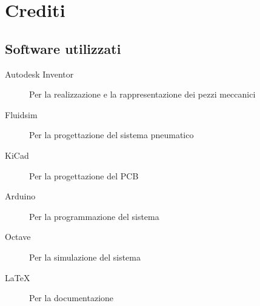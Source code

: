 \documentclass{report}
\begin{document}
\chapter{Crediti}
\section{Software utilizzati}
\begin{description}
\item[Autodesk Inventor]Per la realizzazione e la rappresentazione dei pezzi meccanici
  \item[Fluidsim]Per la progettazione del sistema pneumatico
\item[KiCad]Per la progettazione del PCB
\item[Arduino]Per la programmazione del sistema
\item[Octave]Per la simulazione del sistema
\item[\LaTeX]Per la documentazione
\end{description}





\end{document}
